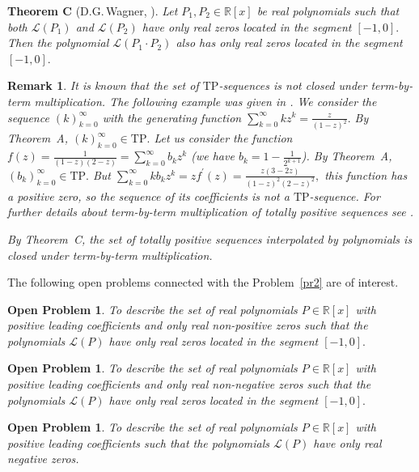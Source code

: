 \documentclass[12pt]{amsart}
\newcounter{count}
\numberwithin{count}{section}
\newtheorem{Remark}[count]{Remark}
\newtheorem{Problem}[count]{Open Problem}
\begin{document}
{\bf Theorem C} (D.G.\,Wagner, \cite{wagner}). { \it  Let 
$P_1, P_2 \in \mathbb{R}[x]$ be real polynomials such that both $\mathcal{L}(P_1)$ and 
$\mathcal{L}(P_2)$ have only real zeros located in the segment $[-1, 0].$ Then the
polynomial $\mathcal{L}(P_1\cdot P_2)$ also has only real zeros 
located in the segment $[-1, 0].$ }

\begin{Remark}   It is known that the set of $\mathrm{TP}$-sequences is not closed under
term-by-term multiplication. The following example was given in \cite{kavish}.
We consider the sequence $ (k)_{k=0}^\infty$ with the generating
function $\sum_{k=0}^\infty  k z^k= \frac{z}{(1-z)^2}.$ By Theorem~A, $ (k)_{k=0}^\infty
\in \mathrm{TP}.$ Let us consider the function $f(z) = \frac{1}{(1-z)(2-z)}= \sum_{k=0}^\infty
b_k z^k$  (we have  $b_k =1 - \frac{1}{2^{k+1}}$). By Theorem~A, $ (b_k)_{k=0}^\infty
\in \mathrm{TP}.$ But $\sum_{k=0}^\infty k b_k z^k = z f^\prime(z) =
 \frac{z(3 - 2z)}{(1-z)^2 (2-z)^2},$ this function has a positive zero, so the sequence
 of its coefficients is not a $\mathrm{TP}$-sequence. For further details about term-by-term 
multiplication of totally positive sequences  see \cite{kavish}.
 
 By Theorem~C, the set of totally positive 
 sequences interpolated by polynomials is closed under
term-by-term multiplication.
\end{Remark}

The following open problems connected with the Problem~\ref{pr2} are of interest.

\begin{Problem}
\label{pr3}
To describe the set of real polynomials $P\in \mathbb{R}[x]$ with positive leading
coefficients and only real non-positive zeros such that  the polynomials $\mathcal{L}(P)$
have only real zeros located in the segment $[-1, 0].$
\end{Problem}

\begin{Problem}
\label{pr3}
To describe the set of real polynomials $P\in \mathbb{R}[x]$ with positive leading
coefficients and only real non-negative zeros such that  the polynomials $\mathcal{L}(P)$
have only real zeros located in the segment $[-1, 0].$
\end{Problem}


\begin{Problem}
\label{pr3a}
To describe the set of real polynomials $P\in \mathbb{R}[x]$ with positive leading
coefficients such that  the polynomials $\mathcal{L}(P)$
have only real negative zeros.
\end{Problem}
\end{document}
